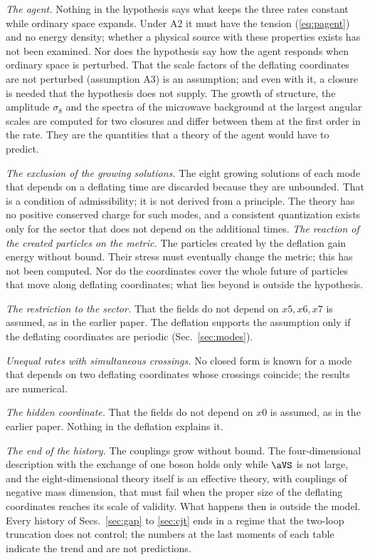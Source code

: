 \emph{The agent.} Nothing in the hypothesis says what keeps the three rates constant while ordinary
space expands. Under A2 it must have the tension (\ref{eq:pagent}) and no energy density; whether a
physical source with these properties exists has not been examined. Nor does the hypothesis say how
the agent responds when ordinary space is perturbed. That the scale factors of the deflating
coordinates are not perturbed (assumption A3) is an assumption; and even with it, a closure is
needed that the hypothesis does not supply. The growth of structure, the amplitude $\sigma_8$ and
the spectra of the microwave background at the largest angular scales are computed for two closures
and differ between them at the first order in the rate. They are the quantities that a theory of
the agent would have to predict.

\emph{The exclusion of the growing solutions.} The eight growing solutions of each mode that depends
on a deflating time are discarded because they are unbounded. That is a condition of admissibility;
it is not derived from a principle. The theory has no positive conserved charge for such modes, and
a consistent quantization exists only for the sector that does not depend on the additional times.
\emph{The reaction of the created particles on the metric.} The particles created by the deflation
gain energy without bound. Their stress must eventually change the metric; this has not been
computed. Nor do the coordinates cover the whole future of particles that move along deflating
coordinates; what lies beyond is outside the hypothesis.

\emph{The restriction to the sector.} That the fields do not depend on $x5,x6,x7$ is assumed, as in
the earlier paper. The deflation supports the assumption only if the deflating coordinates are
periodic (Sec.~\ref{sec:modes}).

\emph{Unequal rates with simultaneous crossings.} No closed form is known for a mode that depends on
two deflating coordinates whose crossings coincide; the results are numerical.

\emph{The hidden coordinate.} That the fields do not depend on $x0$ is assumed, as in the earlier
paper. Nothing in the deflation explains it.

\emph{The end of the history.} The couplings grow without bound. The four-dimensional description
with the exchange of one boson holds only while $\aVS$ is not large, and the eight-dimensional theory
itself is an effective theory, with couplings of negative mass dimension, that must fail when the
proper size of the deflating coordinates reaches its scale of validity. What happens then is outside
the model. Every history of Secs.~\ref{sec:gap} to \ref{sec:cjt} ends in a regime that the two-loop
truncation does not control; the numbers at the last moments of each table indicate the trend and
are not predictions.

